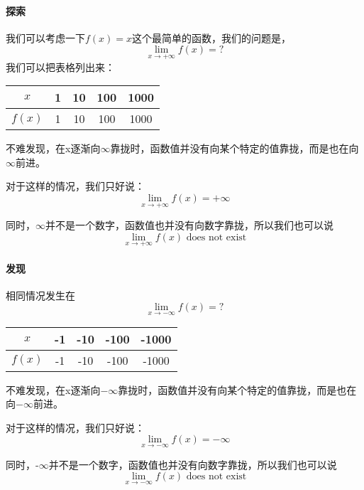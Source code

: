 \documentclass[UTF8]{ctexart}
\begin{document}
\paragraph{探索}
我们可以考虑一下$f(x) = x$这个最简单的函数，我们的问题是，
\[ {\lim_{x\to +\infty }} f(x) = ? \]
我们可以把表格列出来：
\begin{center}
\begin{tabular}{c|c|c|c|c}
\hline
$x$  & 1 & 10 & 100& 1000 \\
\hline
$f(x)$ & 1 &10 & 100 & 1000\\
\hline
\end{tabular}
\end{center}
不难发现，在x逐渐向$\infty$靠拢时，函数值并没有向某个特定的值靠拢，而是也在向$\infty$前进。

对于这样的情况，我们只好说：
\[ {\lim_{x\to +\infty }} f(x) = +\infty \]

同时，$\infty$并不是一个数字，函数值也并没有向数字靠拢，所以我们也可以说
\[ {\lim_{x\to +\infty }} f(x) \text{ does not exist} \]

\paragraph{发现}
相同情况发生在\[ {\lim_{x\to -\infty }} f(x) = ? \]

\begin{center}
\begin{tabular}{c|c|c|c|c}
\hline
$x$  & -1 & -10 & -100& -1000 \\
\hline
$f(x)$ & -1 &-10 & -100 & -1000\\
\hline
\end{tabular}
\end{center}

不难发现，在x逐渐向$-\infty$靠拢时，函数值并没有向某个特定的值靠拢，而是也在向$-\infty$前进。

对于这样的情况，我们只好说：
\[ {\lim_{x\to -\infty }} f(x) = -\infty \]

同时，-$\infty$并不是一个数字，函数值也并没有向数字靠拢，所以我们也可以说
\[ {\lim_{x\to -\infty }} f(x) \text{ does not exist} \]
\end{document}
